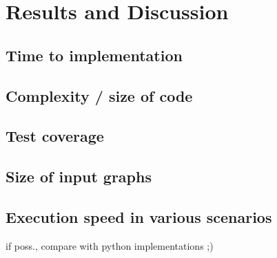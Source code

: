 \chapter{Results and Discussion}
\label{ch:results_discussion}


\section{Time to implementation}
\label{sect:timeto_implementation}


\section{Complexity / size of code}
\label{sect:complexity}


\section{Test coverage}
\label{sect:test_coverage}


\section{Size of input graphs}
\label{sect:graphs_size}


\section{Execution speed in various scenarios}
\label{sect:performance}
if poss., compare with python implementations ;)
